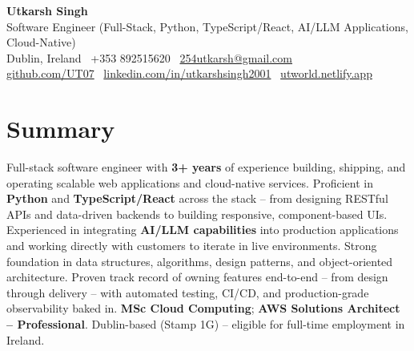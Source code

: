 \documentclass[10pt,a4paper]{article}
\begin{document}
\begin{center}
{\Large \textbf{Utkarsh Singh}}\\[0.04em]
{\normalsize Software Engineer (Full-Stack, Python, TypeScript/React, AI/LLM Applications, Cloud-Native)}\\[0.08em]
Dublin, Ireland \textbar\ +353 892515620 \textbar\ \href{mailto:254utkarsh@gmail.com}{254utkarsh@gmail.com}\\[0.08em]
\href{https://github.com/UT07}{github.com/UT07} \textbar\
\href{https://www.linkedin.com/in/utkarshsingh2001/}{linkedin.com/in/utkarshsingh2001} \textbar\
\href{https://utworld.netlify.app}{utworld.netlify.app}
\end{center}
\vspace{0.06em}

\section*{Summary}
Full-stack software engineer with \textbf{3+ years} of experience building, shipping, and operating scalable web applications and cloud-native services. Proficient in \textbf{Python} and \textbf{TypeScript/React} across the stack -- from designing RESTful APIs and data-driven backends to building responsive, component-based UIs. Experienced in integrating \textbf{AI/LLM capabilities} into production applications and working directly with customers to iterate in live environments. Strong foundation in data structures, algorithms, design patterns, and object-oriented architecture. Proven track record of owning features end-to-end -- from design through delivery -- with automated testing, CI/CD, and production-grade observability baked in. \textbf{MSc Cloud Computing}; \textbf{AWS Solutions Architect -- Professional}. Dublin-based (Stamp 1G) -- eligible for full-time employment in Ireland.
\end{document}

